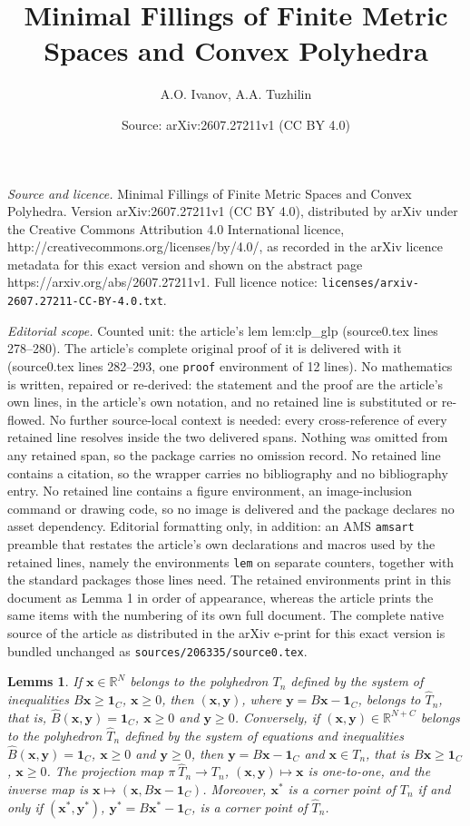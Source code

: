 \documentclass[10pt,a4paper]{amsart}
\title{Minimal Fillings of Finite Metric Spaces and Convex Polyhedra}
\author{A.O. Ivanov, A.A. Tuzhilin}
\date{Source: arXiv:2607.27211v1 (CC BY 4.0)}
\newtheorem{lem}{Lemms}
\newcommand{\R}{{\mathbb R}}
\def\bx{\boldsymbol{x}}
\def\by{\boldsymbol{y}}
\def\hB{{\widehat{B}}}
\def\hT{{\widehat{T}}}
\def\one{\mathbf{1}}
\begin{document}
\maketitle

\noindent\emph{Source and licence.} Minimal Fillings of Finite Metric Spaces and Convex Polyhedra. Version arXiv:2607.27211v1 (CC BY 4.0), distributed by arXiv under the Creative Commons Attribution 4.0 International licence, http://creativecommons.org/licenses/by/4.0/, as recorded in the arXiv licence metadata for this exact version and shown on the abstract page https://arxiv.org/abs/2607.27211v1. Full licence notice: \texttt{licenses/arxiv-2607.27211-CC-BY-4.0.txt}.\par\smallskip

\noindent\textit{Editorial scope.} Counted unit: the article's lem lem:clp\_glp (source0.tex lines 278--280). The article's complete original proof of it is delivered with it (source0.tex lines 282--293, one \texttt{proof} environment of 12 lines). No mathematics is written, repaired or re-derived: the statement and the proof are the article's own lines, in the article's own notation, and no retained line is substituted or re-flowed.  No further source-local context is needed: every cross-reference of every retained line resolves inside the two delivered spans.  Nothing was omitted from any retained span, so the package carries no omission record.  No retained line contains a citation, so the wrapper carries no bibliography and no bibliography entry.  No retained line contains a figure environment, an image-inclusion command or drawing code, so no image is delivered and the package declares no asset dependency.  Editorial formatting only, in addition: an AMS \texttt{amsart} preamble that restates the article's own declarations and macros used by the retained lines, namely the environments \texttt{lem} on separate counters, together with the standard packages those lines need.  The retained environments print in this document as Lemma 1 in order of appearance, whereas the article prints the same items with the numbering of its own full document.  The complete native source of the article as distributed in the arXiv e-print for this exact version is bundled unchanged as \texttt{sources/206335/source0.tex}.
\begin{lem}\label{lem:clp_glp}
If $\bx\in\R^N$ belongs to the polyhedron $T_n$ defined by the system of inequalities $B\bx\ge\one_C$, $\bx\ge0$, then $(\bx,\by)$, where $\by=B\bx -\one_C$, belongs to $\hT_n$, that is, $\hB(\bx,\by)=\one_C$, $\bx\ge0$ and $\by\ge0$. Conversely, if $(\bx,\by)\in\R^{N+C}$ belongs to the polyhedron $\hT_n$ defined by the system of equations and inequalities $\hB(\bx,\by)=\one_C$, $\bx\ge0$ and $\by\ge0$, then $\by=B\bx -\one_C$ and $\bx\in T_n$, that is $B\bx\ge\one_C$, $\bx\ge0$. The projection map $\pi\:\hT_n\to T_n$, $(\bx,\by)\mapsto\bx$ is one-to-one, and the inverse map is $\bx\mapsto(\bx,B\bx-\one_C)$. Moreover, $\bx^*$ is a corner point of $T_n$ if and only if $(\bx^*,\by^*)$, $\by^*=B\bx^*-\one_C$, is a corner point of $\hT_n$.
\end{lem}
\end{document}
